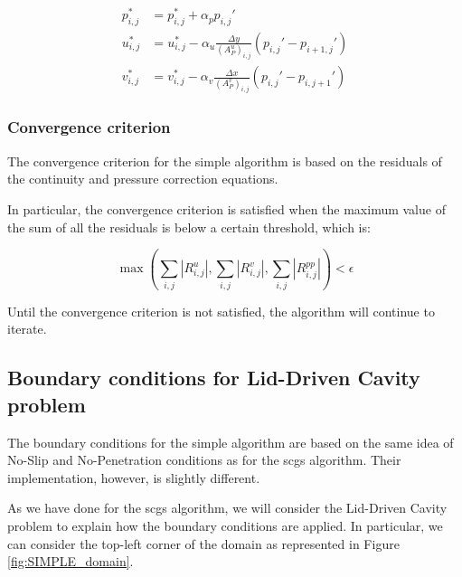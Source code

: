 \begin{align}
    p_{i,j}^* & = p_{i,j}^* + \alpha_p p_{i,j}'                                               \\
    u_{i,j}^* & = u_{i,j}^* - \alpha_u \frac{\Delta y}{(A_P^u)_{i,j}} (p_{i,j}' - p_{i+1,j}') \\
    v_{i,j}^* & = v_{i,j}^* - \alpha_v \frac{\Delta x}{(A_P^v)_{i,j}} (p_{i,j}' - p_{i,j+1}')
\end{align}


\subsubsection{Convergence criterion}

The convergence criterion for the \acrshort{simple} algorithm is based on the residuals of the continuity and pressure correction equations.

In particular, the convergence criterion is satisfied when the maximum value of the sum of all the residuals is below a certain threshold, which is:

\begin{equation}
    \max \left(\sum_{i,j} |R^u_{i,j}|, \sum_{i,j} |R^v_{i,j}|, \sum_{i,j} |R^{pp}_{i,j}| \right) < \epsilon
\end{equation}

Until the convergence criterion is not satisfied, the algorithm will continue to iterate.



\subsection{Boundary conditions for Lid-Driven Cavity problem}
\label{subsec:SIMPLE_boundary_conditions}

The boundary conditions for the \acrshort{simple} algorithm are based on the same idea of No-Slip and No-Penetration conditions as for the \acrshort{scgs} algorithm.
Their implementation, however, is slightly different.

As we have done for the \acrshort{scgs} algorithm, we will consider the Lid-Driven Cavity problem to explain how the boundary conditions are applied.
In particular, we can consider the top-left corner of the domain as represented in Figure \ref{fig:SIMPLE_domain}.

